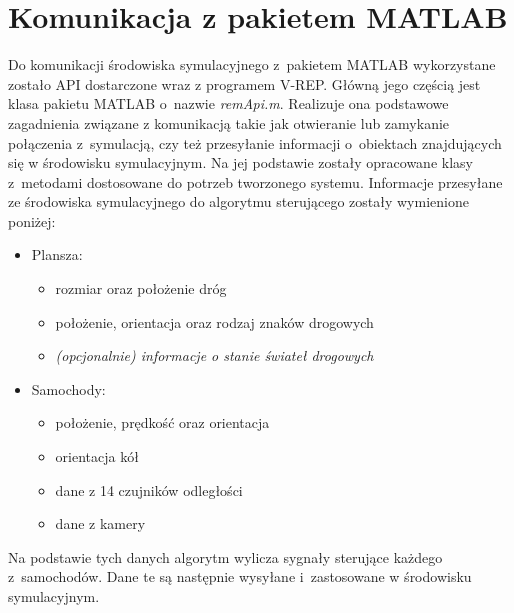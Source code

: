 \newpage
\section{Komunikacja z pakietem MATLAB}

Do komunikacji środowiska symulacyjnego z~pakietem MATLAB wykorzystane zostało API dostarczone wraz z programem V-REP. Główną jego częścią jest klasa pakietu MATLAB o~nazwie \textit{remApi.m}. Realizuje ona podstawowe zagadnienia związane z komunikacją takie jak otwieranie lub zamykanie połączenia z~symulacją, czy też przesyłanie informacji o~obiektach znajdujących się w środowisku symulacyjnym. Na jej podstawie zostały opracowane klasy z~metodami dostosowane do potrzeb tworzonego systemu. Informacje przesyłane ze środowiska symulacyjnego do algorytmu sterującego zostały wymienione poniżej:
\begin{itemize}
	\item Plansza:
	\begin{itemize}
		\item rozmiar oraz położenie dróg
		\item położenie, orientacja oraz rodzaj znaków drogowych
		\item \textit{(opcjonalnie) informacje o stanie świateł drogowych}
	\end{itemize}
	\item Samochody:
	\begin{itemize}
		\item położenie, prędkość oraz orientacja
		\item orientacja kół
		\item dane z 14 czujników odległości
		\item dane z kamery
	\end{itemize}
\end{itemize}
Na podstawie tych danych algorytm wylicza sygnały sterujące każdego z~samochodów. Dane te są następnie wysyłane i~zastosowane w środowisku symulacyjnym.